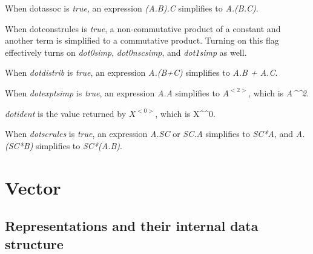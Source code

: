 \documentclass[../Maxima_Workbook.tex]{subfiles}
\begin{document}
\lzz {} \qquad {} \hfill {}

\lz When dotassoc is \emph{true}, an expression \emph{(A.B).C} simplifies to \emph{A.(B.C)}.

\lzz {} \qquad {} \hfill {}

\lz When dotconstrules is \emph{true}, a non-commutative product of a constant and another term is simplified to a commutative product. Turning on this flag effectively turns on \emph{dot0simp}, \emph{dot0nscsimp}, and \emph{dot1simp} as well.

\lzz {} \qquad {} \hfill {}

\lz When \emph{dotdistrib} is \emph{true}, an expression \emph{A.(B+C)} simplifies to \emph{A.B + A.C}.

\lzz {} \qquad {} \hfill {}

\lz When \emph{dotexptsimp} is \emph{true}, an expression \emph{A.A} simplifies to $ A^{<2>} $, which is \emph{A\textasciicircum \textasciicircum 2}.

\lzz {} \qquad {} \hfill {}

\lz \emph{dotident} is the value returned by $ X^{<0>} $, which is X\textasciicircum\textasciicircum 0.


\lzz {} \qquad {} \hfill {}

\lz When \emph{dotscrules} is \emph{true}, an expression \emph{A.SC} or \emph{SC.A} simplifies to \emph{SC*A}, and \emph{A.(SC*B)} simplifies to \emph{SC*(A.B)}.

\section{Vector}

\subsection{Representations and their internal data structure}\label{LA6}
\end{document}

